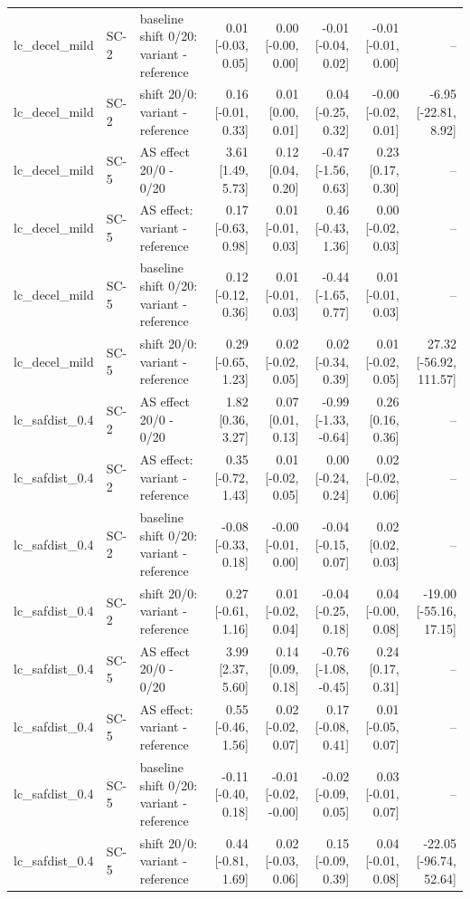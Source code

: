 \begin{table}[htbp]
{\begin{tabular}{lllrrrrr}
lc\_decel\_mild & SC-2 & baseline shift 0/20: variant - reference & 0.01 [-0.03, 0.05] & 0.00 [-0.00, 0.00] & -0.01 [-0.04, 0.02] & -0.01 [-0.01, 0.00] & -- \\
lc\_decel\_mild & SC-2 & shift 20/0: variant - reference & 0.16 [-0.01, 0.33] & 0.01 [0.00, 0.01] & 0.04 [-0.25, 0.32] & -0.00 [-0.02, 0.01] & -6.95 [-22.81, 8.92] \\
lc\_decel\_mild & SC-5 & AS effect 20/0 - 0/20 & 3.61 [1.49, 5.73] & 0.12 [0.04, 0.20] & -0.47 [-1.56, 0.63] & 0.23 [0.17, 0.30] & -- \\
lc\_decel\_mild & SC-5 & AS effect: variant - reference & 0.17 [-0.63, 0.98] & 0.01 [-0.01, 0.03] & 0.46 [-0.43, 1.36] & 0.00 [-0.02, 0.03] & -- \\
lc\_decel\_mild & SC-5 & baseline shift 0/20: variant - reference & 0.12 [-0.12, 0.36] & 0.01 [-0.01, 0.03] & -0.44 [-1.65, 0.77] & 0.01 [-0.01, 0.03] & -- \\
lc\_decel\_mild & SC-5 & shift 20/0: variant - reference & 0.29 [-0.65, 1.23] & 0.02 [-0.02, 0.05] & 0.02 [-0.34, 0.39] & 0.01 [-0.02, 0.05] & 27.32 [-56.92, 111.57] \\
lc\_safdist\_0.4 & SC-2 & AS effect 20/0 - 0/20 & 1.82 [0.36, 3.27] & 0.07 [0.01, 0.13] & -0.99 [-1.33, -0.64] & 0.26 [0.16, 0.36] & -- \\
lc\_safdist\_0.4 & SC-2 & AS effect: variant - reference & 0.35 [-0.72, 1.43] & 0.01 [-0.02, 0.05] & 0.00 [-0.24, 0.24] & 0.02 [-0.02, 0.06] & -- \\
lc\_safdist\_0.4 & SC-2 & baseline shift 0/20: variant - reference & -0.08 [-0.33, 0.18] & -0.00 [-0.01, 0.00] & -0.04 [-0.15, 0.07] & 0.02 [0.02, 0.03] & -- \\
lc\_safdist\_0.4 & SC-2 & shift 20/0: variant - reference & 0.27 [-0.61, 1.16] & 0.01 [-0.02, 0.04] & -0.04 [-0.25, 0.18] & 0.04 [-0.00, 0.08] & -19.00 [-55.16, 17.15] \\
lc\_safdist\_0.4 & SC-5 & AS effect 20/0 - 0/20 & 3.99 [2.37, 5.60] & 0.14 [0.09, 0.18] & -0.76 [-1.08, -0.45] & 0.24 [0.17, 0.31] & -- \\
lc\_safdist\_0.4 & SC-5 & AS effect: variant - reference & 0.55 [-0.46, 1.56] & 0.02 [-0.02, 0.07] & 0.17 [-0.08, 0.41] & 0.01 [-0.05, 0.07] & -- \\
lc\_safdist\_0.4 & SC-5 & baseline shift 0/20: variant - reference & -0.11 [-0.40, 0.18] & -0.01 [-0.02, -0.00] & -0.02 [-0.09, 0.05] & 0.03 [-0.01, 0.07] & -- \\
lc\_safdist\_0.4 & SC-5 & shift 20/0: variant - reference & 0.44 [-0.81, 1.69] & 0.02 [-0.03, 0.06] & 0.15 [-0.09, 0.39] & 0.04 [-0.01, 0.08] & -22.05 [-96.74, 52.64] \\

\end{tabular}}
\end{table}
